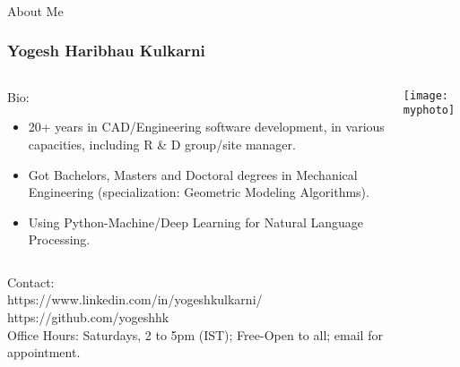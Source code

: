 \begin{frame}[fragile]\frametitle{}
\begin{center}
{\Large About Me}
\end{center}
\end{frame}

\begin{frame}[fragile]\frametitle{Yogesh Haribhau Kulkarni}
\begin{columns}
    \begin{column}[T]{0.6\linewidth}
		Bio:
      \begin{itemize}
		\item 20+ years in CAD/Engineering software development, in various capacities, including R \& D group/site manager. 
		\item Got Bachelors, Masters and Doctoral degrees in Mechanical Engineering (specialization: Geometric Modeling Algorithms). 
		\item Using Python-Machine/Deep Learning for Natural Language Processing.
	  \end{itemize}


    \end{column}
    \begin{column}[T]{0.4\linewidth}
      \centering
      \texttt{[image: myphoto]}
    \end{column}
  \end{columns}
	

\begin{center}
	Contact:\\
https://www.linkedin.com/in/yogeshkulkarni/\\
https://github.com/yogeshhk\\
 Office Hours: Saturdays, 2 to 5pm (IST); Free-Open to all; email for appointment.\\
\end{center}


\end{frame}




